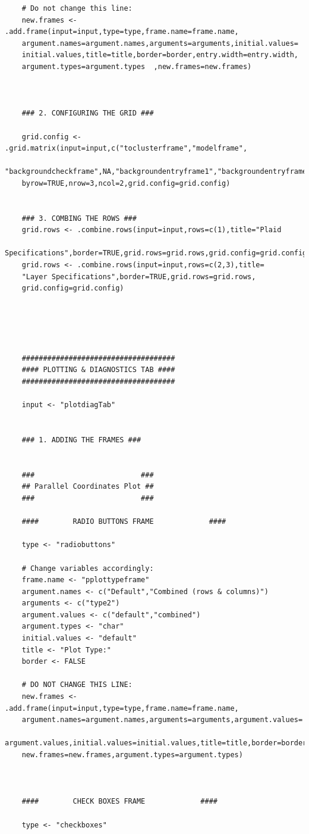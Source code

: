 \documentclass[a4paper]{article}\usepackage[]{graphicx}\usepackage[]{color}
\begin{document}
\begin{verbatim}
	# Do not change this line:
	new.frames <- .add.frame(input=input,type=type,frame.name=frame.name,
    argument.names=argument.names,arguments=arguments,initial.values=
    initial.values,title=title,border=border,entry.width=entry.width,
    argument.types=argument.types  ,new.frames=new.frames)
	
	
	
	### 2. CONFIGURING THE GRID ###
	
	grid.config <- .grid.matrix(input=input,c("toclusterframe","modelframe",
    "backgroundcheckframe",NA,"backgroundentryframe1","backgroundentryframe2"),
    byrow=TRUE,nrow=3,ncol=2,grid.config=grid.config)
	
	
	### 3. COMBING THE ROWS ###
	grid.rows <- .combine.rows(input=input,rows=c(1),title="Plaid 
    Specifications",border=TRUE,grid.rows=grid.rows,grid.config=grid.config)
	grid.rows <- .combine.rows(input=input,rows=c(2,3),title=
    "Layer Specifications",border=TRUE,grid.rows=grid.rows,
    grid.config=grid.config)
	
	
	
	
	
	####################################
	#### PLOTTING & DIAGNOSTICS TAB ####
	####################################
	
	input <- "plotdiagTab"
	
	
	### 1. ADDING THE FRAMES ###
	
	
	###                         ###
	## Parallel Coordinates Plot ##
	###                         ###
	
	####		RADIO BUTTONS FRAME  			####
	
	type <- "radiobuttons"
	
	# Change variables accordingly:
	frame.name <- "pplottypeframe"
	argument.names <- c("Default","Combined (rows & columns)")  
	arguments <- c("type2")		
	argument.values <- c("default","combined") 
	argument.types <- "char"
	initial.values <- "default" 
	title <- "Plot Type:"
	border <- FALSE
	
	# DO NOT CHANGE THIS LINE:
	new.frames <- .add.frame(input=input,type=type,frame.name=frame.name,
    argument.names=argument.names,arguments=arguments,argument.values=
    argument.values,initial.values=initial.values,title=title,border=border,
    new.frames=new.frames,argument.types=argument.types)	
	
	
	
	####		CHECK BOXES FRAME 			  ####
	
	type <- "checkboxes"
	

\end{verbatim}
\end{document}

